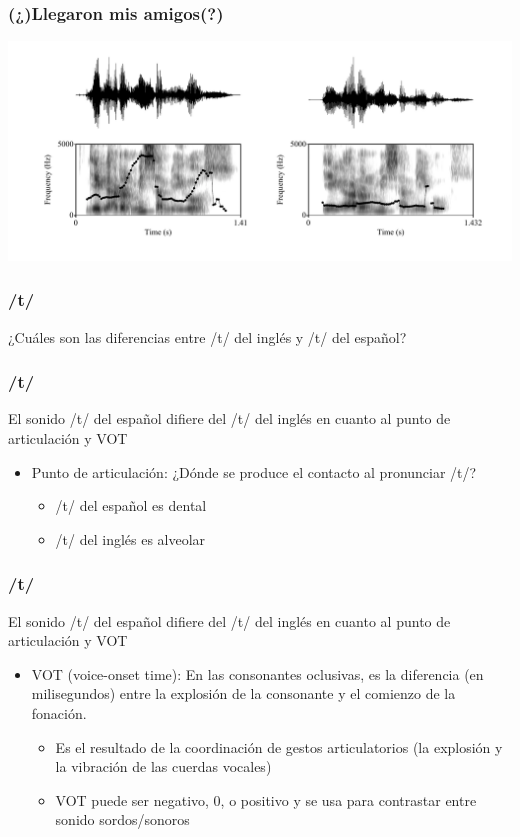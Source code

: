 \documentclass{beamer}
\begin{document}
\begin{frame}
	\frametitle{(¿)Llegaron mis amigos(?)}
	\includegraphics[width=\textwidth]{figures/llegaron.pdf}	
\end{frame}





\begin{frame}
	\frametitle{/t/}

	¿Cuáles son las diferencias entre /t/ del inglés y /t/ del español?

\end{frame}

\begin{frame}
	\frametitle{/t/}

	El sonido /t/ del español difiere del /t/ del inglés en cuanto al punto de articulación y VOT
	\vspace{.2in}

	\begin{itemize}
		\item Punto de articulación: ¿Dónde se produce el contacto al pronunciar /t/?
		\begin{itemize}
			\item /t/ del español es dental 
			\item /t/ del inglés es alveolar
		\end{itemize}
	\end{itemize}
\end{frame}

\begin{frame}
	\frametitle{/t/}

	El sonido /t/ del español difiere del /t/ del inglés en cuanto al punto de articulación y VOT	
	\vspace{.2in}

	\begin{itemize}
		\item VOT (voice-onset time): En las consonantes oclusivas, es la diferencia (en milisegundos) entre la explosión de la consonante y el comienzo de la fonación.
		\begin{itemize}
		 	\item Es el resultado de la coordinación de gestos articulatorios (la explosión y la vibración de las cuerdas vocales)
		 	\item VOT puede ser negativo, 0, o positivo y se usa para contrastar entre sonido sordos/sonoros
		 \end{itemize} 
	\end{itemize}
\end{frame}
\end{document}
